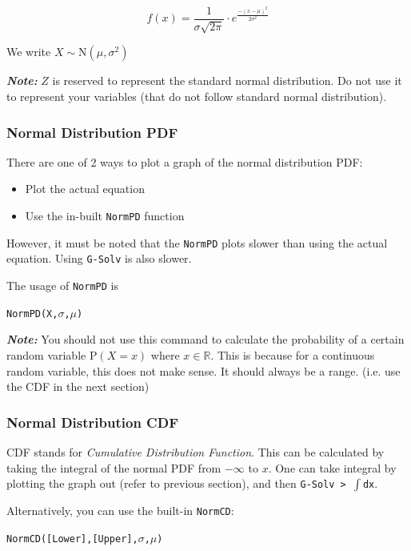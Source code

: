 \documentclass[a5paper,draft]{memoir}
\def\code#1{\texttt{#1}}
\def\note#1{\textbf{\textit{Note:}} #1}
\newcommand{\addtoindex}[1]{#1\index{#1}}
\begin{document}
\begin{equation}
	f(x)=\frac{1}{\sigma\sqrt{2\pi}} \cdot e^{\frac{-(x-\mu)^2}{2\sigma^2}}
\end{equation}

We write $X \sim \mathrm{N} (\mu,\sigma^2)$

\note{$Z$ is reserved to represent the standard normal distribution. Do not use it to represent your variables (that do not follow standard normal distribution).}

\subsubsection{Normal Distribution PDF}
There are one of 2 ways to plot a graph of the normal distribution PDF:

\begin{itemize}
	\item Plot the actual equation
	\item Use the in-built \code{NormPD} function
\end{itemize}

However, it must be noted that the \code{NormPD} plots slower than using the actual equation. Using \code{G-Solv} is also slower.

The usage of \code{\addtoindex{NormPD}} is 
\begin{center}
	\code{NormPD(X,$\sigma$,$\mu$)}
\end{center}

\note{You should not use this command to calculate the probability of a certain random variable $\textrm{P}(X = x)$ where $x \in \mathbb{R}$. This is because for a continuous random variable, this does not make sense. It should always be a range. (i.e. use the CDF in the next section)}

\subsubsection{Normal Distribution CDF}
CDF stands for \textit{Cumulative Distribution Function}. This can be calculated by taking the integral of the normal PDF from $-\infty$ to $x$. One can take integral by plotting the graph out (refer to previous section), and then \code{G-Solv > $\int$dx}.

Alternatively, you can use the built-in \code{\addtoindex{NormCD}}:
\begin{center}
	\code{NormCD([Lower],[Upper],$\sigma$,$\mu$)}
\end{center}
\end{document}
